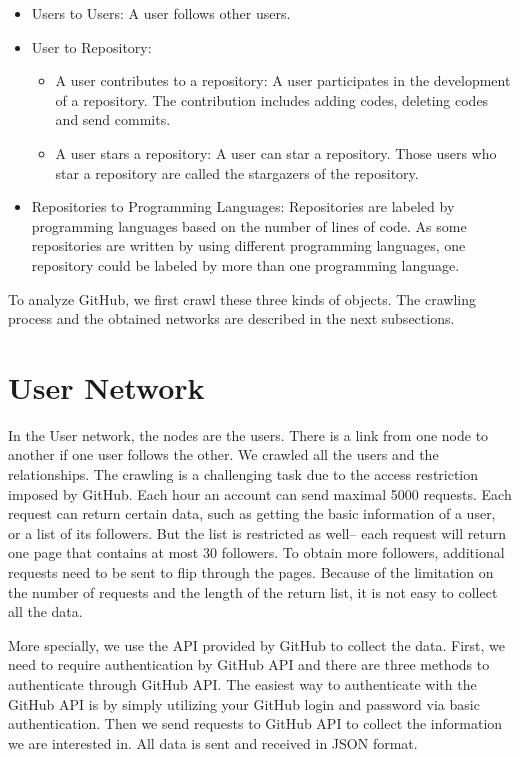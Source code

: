 \documentclass[12pt,oneside,final]{vlsithesis}
\begin{document}
\begin{itemize}
	\item Users to Users: A user follows other users. 
	\item User to Repository:
	\begin{itemize}
		\item A user contributes to a repository: A user participates in the development  of a repository. The contribution includes adding codes, deleting codes and send commits. %
		\item A user stars a repository: A user can star a repository. Those users who star a  repository are called the stargazers of the repository. 
	\end{itemize}

	\item Repositories to Programming Languages: Repositories are labeled by programming languages based on the number of lines of code. As some repositories are written by using different programming languages, one repository could be labeled by more than one programming language. 
\end{itemize}

To analyze GitHub, we first crawl these three kinds of objects. The crawling process and the obtained networks are described in the next subsections. 

\section{User Network}

In the User network, the nodes are the users. There is a link from one node to another if one user follows the other. We crawled all the users and the relationships. The crawling is a challenging task due to the access restriction imposed by GitHub. Each hour an account can send maximal 5000 requests. Each request can return certain data, such as getting the basic information of a user, or a list of its followers. But the list is restricted as well-- each request will return one page that contains at most 30 followers. To obtain more followers, additional requests need to be sent to flip through the pages. Because of the limitation on the number of requests and the length of the return list, it is not easy to collect all the data.  

More specially,  we use the API provided by GitHub to collect the data. %
First, we need to require authentication by GitHub API and there are three methods to authenticate through GitHub API. The easiest way to authenticate with the GitHub API is by simply utilizing your GitHub login and password via basic authentication.  Then we send requests to GitHub API to collect the information we are interested in. All data is sent and received in JSON format.
\end{document}
